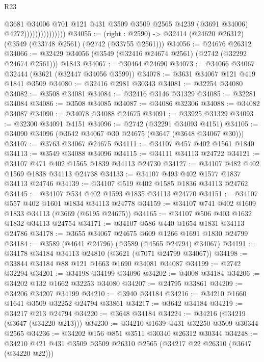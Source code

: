 \begin{lexlean}{R23}
\begin{coremodule}
                                @3681
                                  @34006
                                  @701
                                  @121
                                  @431
                                  @3509
                                  @3509
                                  @2565
                                  @4239
                                  (@3691 @34006)
                                  @4272)))))))))))))))
@34055 := (right : @2590) -> @32414 (@24620 @26312) (@3549 (@33748 @2561) (@2742 (@33755 @2561)))
@34056 := @24676 @26312
@34066 := @32429 @34056 (@3549 (@32416 @24674 @2561) (@2742 (@32292 @24674 @2561))) @1843
@34067 := @30464 @24690
@34073 := @34066 @34067 @32444 (@3621 (@32447 @34056 @3599))
@34078 := @3631 @34067 @121 @419 @1841 @3509
@34080 := @32416 @2981 @30343
@34081 := @32254 @34080
@34082 := @3508 @34081
@34084 := @32416 @3146 @31329
@34085 := @32281 @34084
@34086 := @3508 @34085
@34087 := @34086 @32306
@34088 := @34082 @34087
@34090 := @34078 @34088 @24675
@34091 := @33925 @31329
@34093 := @32300 @34091 @4151
@34096 := @2742 (@32291 @34093 @4151)
@34105 := @34090 @34096 (@3642 @34067 @30 @24675 (@3647 (@3648 @34067 @30)))
@34107 := @3763 @34067 @24675
@34111 := @34107 @457 @402 @1561 @1840
@34113 := @3549 @34088 @34096
@34115 := @34111 @34113 @24722
@34121 := @34107 @471 @402 @1565 @1839 @34113 @24730
@34127 := @34107 @482 @402 @1569 @1838 @34113 @24738
@34133 := @34107 @493 @402 @1577 @1837 @34113 @24746
@34139 := @34107 @519 @402 @1585 @1836 @34113 @24762
@34145 := @34107 @534 @402 @1593 @1835 @34113 @24770
@34151 := @34107 @557 @402 @1601 @1834 @34113 @24778
@34159 := @34107 @741 @402 @1609 @1833 @34113 (@3669 (@6195 @24675))
@34165 := @34107 @506 @403 @1632 @1832 @34113 @24754
@34171 := @34107 @586 @440 @1654 @1831 @34113 @24786
@34178 := @3655 @34067 @24675 @609 @1266 @1691 @1830 @24799
@34184 := @3589 (@4641 @24796) (@3589 (@4565 @24794) @34067)
@34191 := @34178 @34184 @34113 @24810 (@3621 (@7071 @24799 @34067))
@34198 := @33844 @34184 @88 @121 @1663 @1690 @34081 @34087
@34199 := @2742 @32294
@34201 := @34198 @34199 @34096
@34202 := @4008 @34184
@34206 := @34202 @132 @1662 @32253 @34080
@34207 := @24795 @33861
@34209 := @34206 @34207 @34199
@34210 := @3940 @34184
@34216 := @34210 @1660 @1641 @3509 @32252 @24794 @33861
@34217 := @3642 @34184
@34219 := @34217 @213 @24794
@34220 := @3648 @34184
@34224 := @34216 (@34219 (@3647 (@34220 @213)))
@34230 := @34210 @1639 @431 @32250 @3509 @30344 @2565
@34236 := @34202 @156 @851 @3511 @30340 @26312 @30344
@34248 := @34210 @421 @431 @3509 @3509 @26310 @2565 (@34217 @22 @26310 (@3647 (@34220 @22)))

\end{coremodule}
\end{lexlean}
